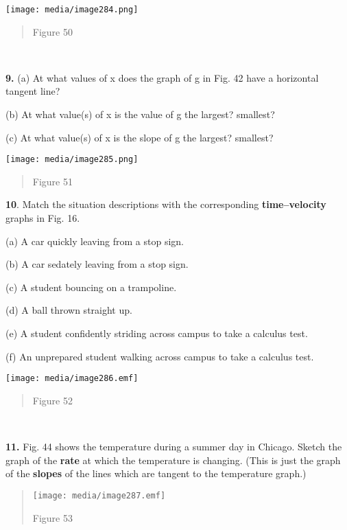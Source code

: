 \texttt{[image: media/image284.png]}

\begin{quote}
Figure 50
\end{quote}

\textbf{\\
}

\textbf{9.} (a) At what values of x does the graph of g in Fig. 42 have
a horizontal tangent line?

(b) At what value(s) of x is the value of g the largest? smallest?

(c) At what value(s) of x is the slope of g the largest? smallest?

\texttt{[image: media/image285.png]}

\begin{quote}
Figure 51
\end{quote}

\textbf{10}. Match the situation descriptions with the corresponding
\textbf{time--velocity} graphs in Fig. 16.

(a) A car quickly leaving from a stop sign.

(b) A car sedately leaving from a stop sign.

(c) A student bouncing on a trampoline.

(d) A ball thrown straight up.

(e) A student confidently striding across campus to take a calculus
test.

(f) An unprepared student walking across campus to take a calculus test.

\texttt{[image: media/image286.emf]}

\begin{quote}
Figure 52
\end{quote}

\textbf{\\
}

\textbf{11.} Fig. 44 shows the temperature during a summer day in
Chicago. Sketch the graph of the \textbf{rate} at which the temperature
is changing. (This is just the graph of the \textbf{slopes} of the lines
which are tangent to the temperature graph.)

\begin{quote}
\texttt{[image: media/image287.emf]}

Figure 53
\end{quote}

